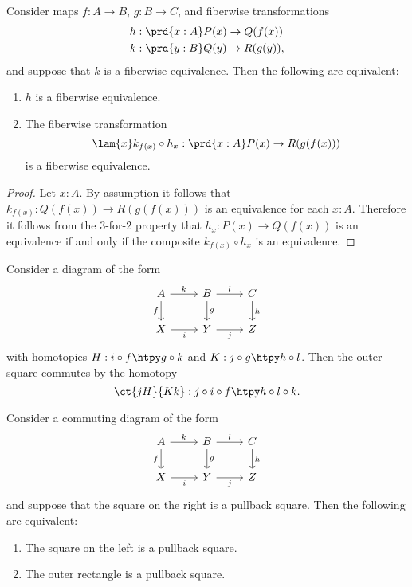\begin{lem}
Consider maps $f:A\to B$, $g:B\to C$, and fiberwise transformations
\begin{align*}
h & : \prd{x:A} P(x)\to Q(f(x)) \\
k & : \prd{y:B} Q(y)\to R(g(y)),
\end{align*}
and suppose that $k$ is a fiberwise equivalence. Then the following are equivalent:
\begin{enumerate}
\item $h$ is a fiberwise equivalence.
\item The fiberwise transformation
\begin{equation*}
\lam{x} k_{f(x)}\circ h_x : \prd{x:A} P(x)\to R(g(f(x)))
\end{equation*}
is a fiberwise equivalence. 
\end{enumerate}
\end{lem}

\begin{proof}
Let $x:A$. By assumption it follows that $k_{f(x)}:Q(f(x))\to R(g(f(x)))$ is an equivalence for each $x:A$.
Therefore it follows from the 3-for-2 property that $h_x:P(x)\to Q(f(x))$ is an equivalence if and only if the composite $k_{f(x)}\circ h_x$ is an equivalence. 
\end{proof}

\begin{defn}
Consider a diagram of the form
\begin{equation*}
\begin{tikzcd}
A \arrow[r,"k"] \arrow[d,swap,"f"] & B \arrow[r,"l"] \arrow[d,"g"] & C \arrow[d,"h"] \\
X \arrow[r,swap,"i"] & Y \arrow[r,swap,"j"] & Z
\end{tikzcd}
\end{equation*}
with homotopies $H:i\circ f\htpy g\circ k$ and $K:j\circ g\htpy h\circ l$. Then the outer square commutes by the homotopy
\begin{equation*}
\ct{jH}{Kk}:j\circ i\circ f\htpy h\circ l\circ k.
\end{equation*}
\end{defn}

\begin{lem}
Consider a commuting diagram of the form
\begin{equation*}
\begin{tikzcd}
A \arrow[r,"k"] \arrow[d,swap,"f"] & B \arrow[r,"l"] \arrow[d,"g"] & C \arrow[d,"h"] \\
X \arrow[r,swap,"i"] & Y \arrow[r,swap,"j"] & Z
\end{tikzcd}
\end{equation*}
and suppose that the square on the right is a pullback square. Then the following are equivalent:
\begin{enumerate}
\item The square on the left is a pullback square.
\item The outer rectangle is a pullback square.
\end{enumerate}
\end{lem}

